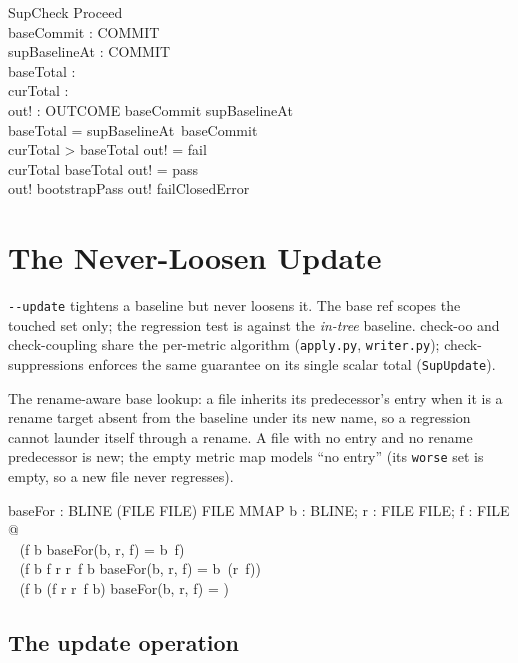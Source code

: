 \documentclass[a4paper,10pt,fleqn]{article}
\begin{document}
\begin{schema}{SupCheck}
Proceed \\
baseCommit : COMMIT \\
supBaselineAt : COMMIT \pfun \nat \\
baseTotal : \nat \\
curTotal : \nat \\
out! : OUTCOME
\where
baseCommit \in \dom supBaselineAt \\
baseTotal = supBaselineAt~baseCommit \\
curTotal > baseTotal \implies out! = fail \\
curTotal \leq baseTotal \implies out! = pass \\
out! \neq bootstrapPass \land out! \neq failClosedError
\end{schema}

\section{The Never-Loosen Update}

\texttt{-{}-update} tightens a baseline but never loosens it. The base ref
scopes the touched set only; the regression test is against the
\emph{in-tree} baseline. check-oo and check-coupling share the per-metric
algorithm (\texttt{apply.py}, \texttt{writer.py}); check-suppressions
enforces the same guarantee on its single scalar total
(\texttt{SupUpdate}).

The rename-aware base lookup: a file inherits its predecessor's entry when
it is a rename target absent from the baseline under its new name, so a
regression cannot launder itself through a rename. A file with no entry and
no rename predecessor is new; the empty metric map models ``no entry''
(its \texttt{worse} set is empty, so a new file never regresses).

\begin{axdef}
baseFor : BLINE \cross (FILE \pinj FILE) \cross FILE \fun MMAP
\where
\forall b : BLINE; r : FILE \pinj FILE; f : FILE @ \\
\quad~ (f \in \dom b \implies baseFor(b, r, f) = b~f) \\
\quad~ \land (f \notin \dom b \land f \in \dom r \land r~f \in \dom b \implies baseFor(b, r, f) = b~(r~f)) \\
\quad~ \land (f \notin \dom b \land \lnot (f \in \dom r \land r~f \in \dom b) \implies baseFor(b, r, f) = \emptyset)
\end{axdef}

\subsection{The update operation}
\end{document}
